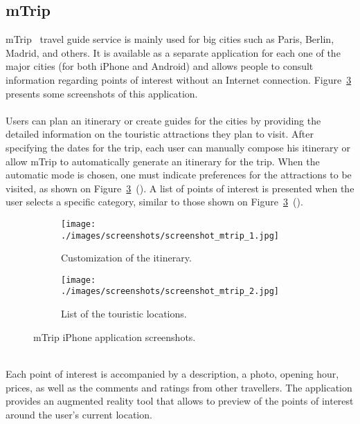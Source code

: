 \subsection{mTrip}
mTrip~\cite{mTrip} travel guide service is mainly used for big cities such as Paris, Berlin,  Madrid, and others. It is available as a separate application for each one of the major cities (for both iPhone and Android) and allows people to consult information regarding points of interest without an Internet connection. Figure~\ref{fig:mtripScreenshots} presents some screenshots of this application. \\
\\
Users can plan an itinerary or create guides for the cities by providing the detailed information on the touristic attractions they plan to visit. After specifying the dates for the trip, each user can manually compose his itinerary or allow mTrip to automatically generate an itinerary for the trip. When the automatic mode is chosen, one must indicate preferences for the attractions to be visited, as shown on Figure~\ref{fig:mtripScreenshots}~(). A list of points of interest is presented when the user selects a specific category, similar to those shown on Figure~\ref{fig:mtripScreenshots}~().
\\
\begin{figure}
        \centering
        \begin{subfigure}[b]{0.25\textwidth}
                \centering
                \texttt{[image: ./images/screenshots/screenshot\_mtrip\_1.jpg]}
                \caption{Customization of the itinerary.}
                \label{fig:mTripPreferencesCustomization}
        \end{subfigure}%
        \quad\quad\quad\quad\quad\quad
        \begin{subfigure}[b]{0.25\textwidth}
                \centering
                \texttt{[image: ./images/screenshots/screenshot\_mtrip\_2.jpg]}
                \caption{List of the touristic locations.}
                \label{fig:mTripTouisticLocations}
        \end{subfigure}
        \caption{mTrip iPhone application screenshots.}
        \label{fig:mtripScreenshots}
\end{figure}
\\
Each point of interest is accompanied by a description, a photo, opening hour, prices, as well as the comments and ratings from other travellers. The application provides an augmented reality tool that allows to preview of the points of interest around the user's current location.
